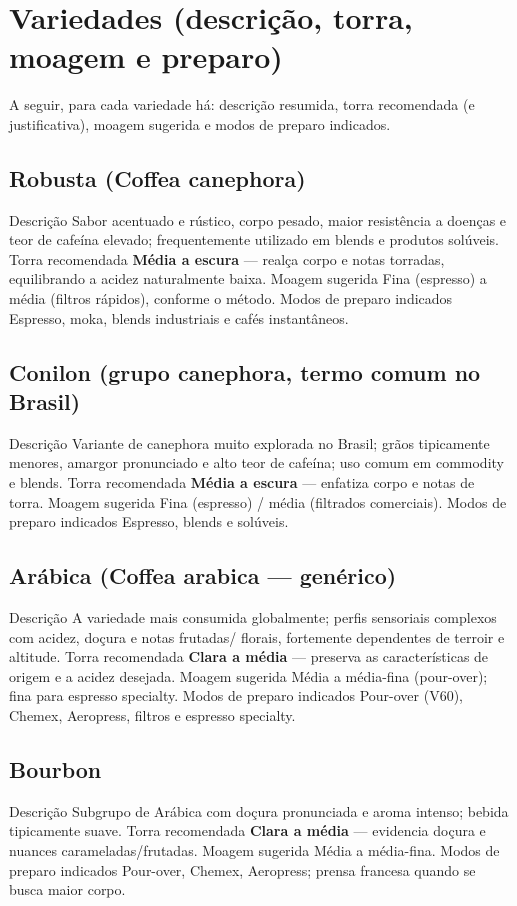 \documentclass[a4paper,12pt]{article}
\begin{document}
\section{Variedades (descrição, torra, moagem e preparo)}
A seguir, para cada variedade há: descrição resumida, torra recomendada (e justificativa), moagem sugerida e modos de preparo indicados.

\subsection{Robusta (Coffea canephora)}
{Descrição} Sabor acentuado e rústico, corpo pesado, maior resistência a doenças e teor de cafeína elevado; frequentemente utilizado em blends e produtos solúveis.  
{Torra recomendada} \textbf{Média a escura} — realça corpo e notas torradas, equilibrando a acidez naturalmente baixa.  
{Moagem sugerida} Fina (espresso) a média (filtros rápidos), conforme o método.  
{Modos de preparo indicados} Espresso, moka, blends industriais e cafés instantâneos.

\subsection{Conilon (grupo canephora, termo comum no Brasil)}
{Descrição} Variante de canephora muito explorada no Brasil; grãos tipicamente menores, amargor pronunciado e alto teor de cafeína; uso comum em commodity e blends.  
{Torra recomendada} \textbf{Média a escura} — enfatiza corpo e notas de torra.  
{Moagem sugerida} Fina (espresso) / média (filtrados comerciais).  
{Modos de preparo indicados} Espresso, blends e solúveis.

\subsection{Arábica (Coffea arabica — genérico)}
{Descrição} A variedade mais consumida globalmente; perfis sensoriais complexos com acidez, doçura e notas frutadas/ florais, fortemente dependentes de terroir e altitude.  
{Torra recomendada} \textbf{Clara a média} — preserva as características de origem e a acidez desejada.  
{Moagem sugerida} Média a média-fina (pour-over); fina para espresso specialty.  
{Modos de preparo indicados} Pour-over (V60), Chemex, Aeropress, filtros e espresso specialty.

\subsection{Bourbon}
{Descrição} Subgrupo de Arábica com doçura pronunciada e aroma intenso; bebida tipicamente suave.  
{Torra recomendada} \textbf{Clara a média} — evidencia doçura e nuances carameladas/frutadas.  
{Moagem sugerida} Média a média-fina.  
{Modos de preparo indicados} Pour-over, Chemex, Aeropress; prensa francesa quando se busca maior corpo.
\end{document}
